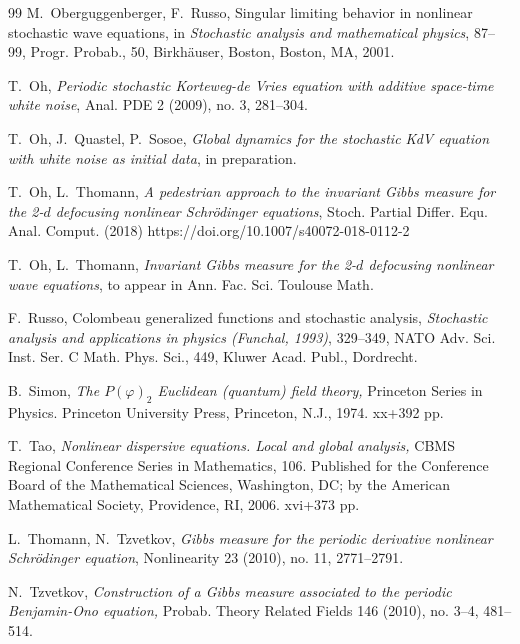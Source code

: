 \documentclass[letterpaper, 11pt,  reqno]{amsart}
\newcommand{\1}{\hspace{0.5mm}\text{I}\hspace{0.5mm}}
\numberwithin{equation}{section}
\numberwithin{theorem}{section}
\begin{document}
\begin{thebibliography}{99}
M.~Oberguggenberger, F.~Russo, Singular limiting behavior in nonlinear stochastic wave equations, in {\it Stochastic analysis and mathematical physics}, 87--99, Progr. Probab., 50, Birkh\"auser, Boston, 
 Boston, MA, 2001.




T.~Oh, {\it Periodic stochastic Korteweg-de Vries equation with additive space-time white noise}, Anal. PDE 2 (2009), no. 3, 281--304. 

T.~Oh, J.~Quastel, P.~Sosoe, 
{\it Global dynamics for the stochastic KdV
equation with white noise as initial data}, in preparation.

   
T.~Oh, L.~Thomann, 
{\it 
 A pedestrian approach to the invariant Gibbs measure for 
the 2-$d$ defocusing nonlinear Schr\"odinger equations}, 
 Stoch. Partial Differ. Equ. Anal. Comput. (2018) https://doi.org/10.1007/s40072-018-0112-2 



T.~Oh, L.~Thomann, 
{\it Invariant Gibbs measure for 
the 2-$d$ defocusing nonlinear wave  equations}, 
to appear in Ann. Fac. Sci. Toulouse Math.





F.~Russo, 
 Colombeau generalized functions and stochastic analysis,  {\it Stochastic analysis and applications in physics (Funchal, 1993)}, 329--349, NATO Adv. Sci. Inst. Ser. C Math. Phys. Sci., 449, Kluwer Acad. Publ., Dordrecht. %



B.~Simon, 
{\it  The $P(\varphi)_2$ Euclidean (quantum) field theory,} Princeton Series in Physics. Princeton University Press, Princeton, N.J., 1974. xx+392 pp.


T.~Tao, {\it Nonlinear dispersive equations. Local and global analysis,} CBMS Regional Conference Series in Mathematics, 106. Published for the Conference Board of the Mathematical Sciences, Washington, DC; by the American Mathematical Society, Providence, RI, 2006. xvi+373 pp.

L.~Thomann, N.~Tzvetkov, 
{\it Gibbs measure for the periodic derivative nonlinear Schr\"odinger equation},
Nonlinearity 23 (2010), no. 11, 2771--2791.


N.~Tzvetkov, {\it Construction of a Gibbs measure associated to the periodic Benjamin-Ono equation,} Probab. Theory Related Fields 146 (2010), no. 3--4, 481--514.




\end{thebibliography}
\end{document}
